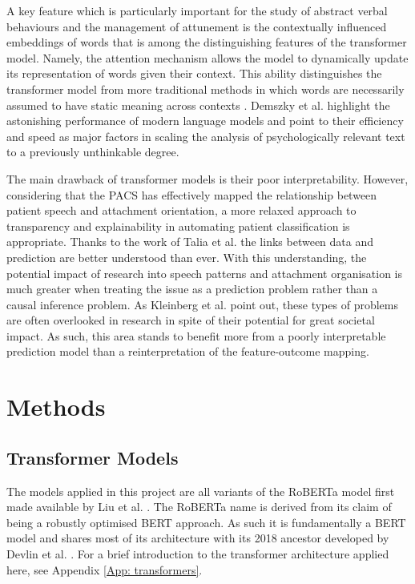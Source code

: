 \documentclass[12pt]{report}
\begin{document}
A key feature which is particularly important for the study of abstract verbal behaviours and the management of attunement is the contextually influenced embeddings of words that is among the distinguishing features of the transformer model.
Namely, the attention mechanism allows the model to dynamically update its representation of words given their context.
This ability distinguishes the transformer model from more traditional methods in which words are necessarily assumed to have static meaning across contexts \cite{Demszky2023}.
Demszky et al. \citeyear{Demszky2023} highlight the astonishing performance of modern language models and point to their efficiency and speed as major factors in scaling the analysis of psychologically relevant text to a previously unthinkable degree.

The main drawback of transformer models is their poor interpretability.
However, considering that the PACS has effectively mapped the relationship between patient speech and attachment orientation, a more relaxed approach to transparency and explainability in automating patient classification is appropriate.
Thanks to the work of Talia et al. \citeyear{Talia2017, Talia2014} the links between data and prediction are better understood than ever.
With this understanding, the potential impact of research into speech patterns and attachment organisation is much greater when treating the issue as a prediction problem rather than a causal inference problem.
As Kleinberg et al. \citeyear{PredictionPolicyProblems} point out, these types of problems are often overlooked in research in spite of their potential for great societal impact.
As such, this area stands to benefit more from a poorly interpretable prediction model than a reinterpretation of the feature-outcome mapping.

\section{Methods}

\subsection{Transformer Models}
The models applied in this project are all variants of the RoBERTa model first made available by Liu et al. \citeyear{roberta}.
The RoBERTa name is derived from its claim of being a robustly optimised BERT approach.
As such it is fundamentally a BERT model and shares most of its architecture with its 2018 ancestor developed by Devlin et al. \citeyear{BERT}.
For a brief introduction to the transformer architecture applied here, see Appendix \ref{App: transformers}.
\end{document}
